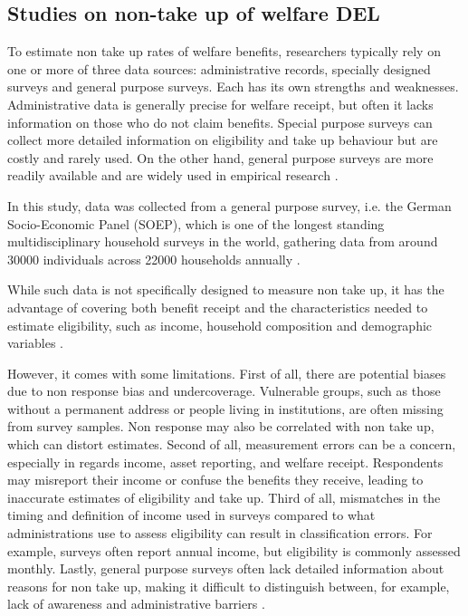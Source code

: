 \subsection{Studies on non-take up of welfare DEL} \label{Studies-on-non-take-up-of-welfare} 

To estimate non take up rates of welfare benefits, researchers typically rely on one or more of three data sources: administrative records, specially designed surveys and general purpose surveys. Each has its own strengths and weaknesses. Administrative data is generally precise for welfare receipt, but often it lacks information on those who do not claim benefits. Special purpose surveys can collect more detailed information on eligibility and take up behaviour but are costly and rarely used. On the other hand, general purpose surveys are more readily available and are widely used in empirical research \citep{mechelen_who_2017}.

In this study, data was collected from a general purpose survey, i.e. the German Socio-Economic Panel (SOEP), which is one of the longest standing multidisciplinary household surveys in the world, gathering data from around 30000 individuals across 22000 households annually \citep{berlin_diw_nodate}.

While such data is not specifically designed to measure non take up, it has the advantage of covering both benefit receipt and the characteristics needed to estimate eligibility, such as income, household composition and demographic variables \citep{mechelen_who_2017}.

However, it comes with some limitations. First of all, there are potential biases due to non response bias and undercoverage. Vulnerable groups, such as those without a permanent address or people living in institutions, are often missing from survey samples. Non response may also be correlated with non take up, which can distort estimates. Second of all, measurement errors can be a concern, especially in regards income, asset reporting, and welfare receipt. Respondents may misreport their income or confuse the benefits they receive, leading to inaccurate estimates of eligibility and take up. Third of all, mismatches in the timing and definition of income used in surveys compared to what administrations use to assess eligibility can result in classification errors. For example, surveys often report annual income, but eligibility is commonly assessed monthly. Lastly, general purpose surveys often lack detailed information about reasons for non take up, making it difficult to distinguish between, for example, lack of awareness and administrative barriers \citep{mechelen_who_2017}.

